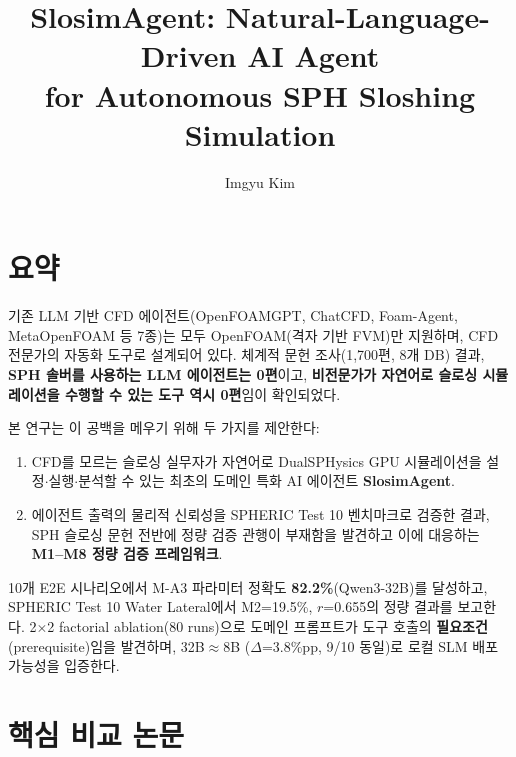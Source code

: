 \documentclass[12pt,a4paper]{article}
\title{SlosimAgent: Natural-Language-Driven AI Agent\\for Autonomous SPH Sloshing Simulation}
\author{Imgyu Kim}
\date{}
\begin{document}
\maketitle

\section{요약}

기존 LLM 기반 CFD 에이전트(OpenFOAMGPT, ChatCFD, Foam-Agent, MetaOpenFOAM 등 7종)는
모두 OpenFOAM(격자 기반 FVM)만 지원하며, CFD 전문가의 자동화 도구로 설계되어 있다.
체계적 문헌 조사(1,700편, 8개 DB) 결과,
\textbf{SPH 솔버를 사용하는 LLM 에이전트는 0편}이고,
\textbf{비전문가가 자연어로 슬로싱 시뮬레이션을 수행할 수 있는 도구 역시 0편}임이 확인되었다.

본 연구는 이 공백을 메우기 위해 두 가지를 제안한다:
\begin{enumerate}[nosep]
\item CFD를 모르는 슬로싱 실무자가 자연어로 DualSPHysics GPU 시뮬레이션을
설정$\cdot$실행$\cdot$분석할 수 있는 최초의 도메인 특화 AI 에이전트 \textbf{SlosimAgent}.
\item 에이전트 출력의 물리적 신뢰성을 SPHERIC Test 10 벤치마크로 검증한 결과,
SPH 슬로싱 문헌 전반에 정량 검증 관행이 부재함을 발견하고
이에 대응하는 \textbf{M1--M8 정량 검증 프레임워크}.
\end{enumerate}

10개 E2E 시나리오에서 M-A3 파라미터 정확도 \textbf{82.2\%}(Qwen3-32B)를 달성하고,
SPHERIC Test 10 Water Lateral에서 M2=19.5\%, $r$=0.655의 정량 결과를 보고한다.
2$\times$2 factorial ablation(80 runs)으로 도메인 프롬프트가 도구 호출의
\textbf{필요조건}(prerequisite)임을 발견하며,
32B$\approx$8B ($\Delta$=3.8\%pp, 9/10 동일)로 로컬 SLM 배포 가능성을 입증한다.

\section{핵심 비교 논문}
\end{document}

